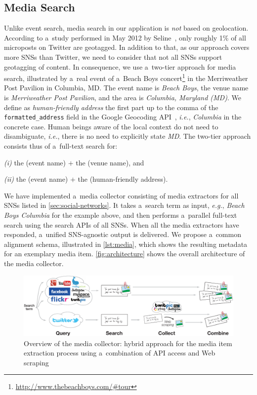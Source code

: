 \documentclass{acm_proc_article-sp}
\let\oldemph\emph
\renewcommand{\emph}[1]{\oldemph{\fontsize{9}{9}\selectfont #1}}
\begin{document}
\subsection{Media Search} \label{sec:media-search}
Unlike event search, media search in our application is \emph{not} based on geolocation.
According to a~study performed in May 2012 by Seline~\cite{Quora2012},
only roughly 1\% of all microposts on Twitter are geotagged.
In addition to that, as our approach covers more SNSs than Twitter,
we need to consider that not all SNSs support geotagging of content.
In consequence, we use a~two-tier approach for media search,
illustrated by a~real event of a~Beach Boys
concert\footnote{\url{http://www.thebeachboys.com/#tour}}
in the Merriweather Post Pavilion in Columbia, MD.
The event name is \emph{Beach Boys},
the venue name is \emph{Merriweather Post Pavilion},
and the area is \emph{Columbia, Maryland (MD)}.
We define as \emph{human-friendly address}
the first part up to the comma of the \texttt{formatted\_address} field
in the Google Geocoding API~\cite{Geocoding2012},
\emph{i.e.}, \emph{Columbia} in the concrete case.
Human beings aware of the local context do not need to disambiguate, \emph{i.e.},
there is no need to explicitly state \emph{MD}.
The two-tier approach consists thus of a~full-text search for:

\emph{(i)} the (event name) $+$ the (venue name), and

\emph{(ii)} the (event name) $+$ the (human-friendly address).

We have implemented a~media collector consisting of media extractors for all SNSs
listed in \autoref{sec:social-networks}.
It takes a~search term as input, \emph{e.g.},
\emph{Beach Boys Columbia} for the example above,
and then performs a~parallel full-text search using the search APIs of all SNSs.
When all the media extractors have responded, a~unified SNS-agnostic output is delivered.
We propose a~common alignment schema, illustrated in
\autoref{lst:media}, which shows the resulting metadata for an exemplary media item.
\autoref{fig:architecture} shows the overall architecture of the media collector.

\begin{figure}[bh!]
\centering
\includegraphics[width=0.8\linewidth]{./architecture.pdf}
\caption{Overview of the media collector: hybrid approach for the media item extraction process using a~combination of API access and Web scraping}
\label{fig:architecture}
\end{figure}
\end{document}
